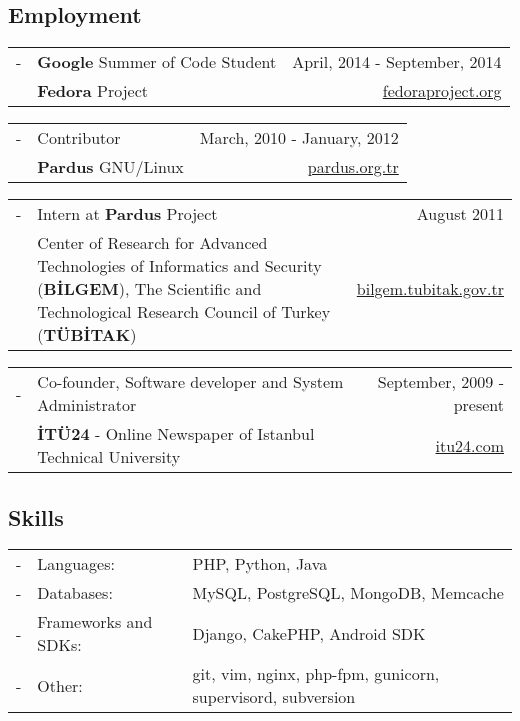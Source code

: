 \documentclass[11pt,a4paper]{article}
\renewenvironment{itemize}{
  \begin{list}{}{
    \setlength{\leftmargin}{0em}
  }
}{
  \end{list}
}
\begin{document}
\subsection*{Employment}
\begin{itemize}
\item
\begin{tabularx}{\textwidth}{l X r}
- & \textbf{Google} Summer of Code Student & April, 2014 - September, 2014\\
& \textbf{Fedora} Project & \href{http://fedoraproject.org/}{fedoraproject.org}
\end{tabularx}
\item
\begin{tabularx}{\textwidth}{l X r}
- & Contributor & March, 2010 - January, 2012\\
& \textbf{Pardus} GNU/Linux & \href{http://www.pardus.org.tr/}{pardus.org.tr}
\end{tabularx}
\item
\begin{tabularx}{\textwidth}{l X r}
- & Intern at \textbf{Pardus} Project & August 2011\\
& Center of Research for Advanced Technologies of Informatics and Security (\textbf{BİLGEM}), The Scientific and Technological Research Council of Turkey (\textbf{TÜBİTAK}) & \href{http://bilgem.tubitak.gov.tr}{bilgem.tubitak.gov.tr}
\end{tabularx}
\item
\begin{tabularx}{\textwidth}{l X r}
- & Co-founder, Software developer and System Administrator & September, 2009 - present\\
& \textbf{İTÜ24} - Online Newspaper of Istanbul Technical University & \href{http://itu24.com}{itu24.com}
\end{tabularx}
\end{itemize}

\subsection*{Skills}
\begin{tabularx}{\textwidth}{l l X}
- & Languages: & PHP, Python, Java\\
- & Databases: & MySQL, PostgreSQL, MongoDB, Memcache\\
- & Frameworks and SDKs: & Django, CakePHP, Android SDK\\
- & Other: & git, vim, nginx, php-fpm, gunicorn, supervisord, subversion
\end{tabularx}
\end{document}
